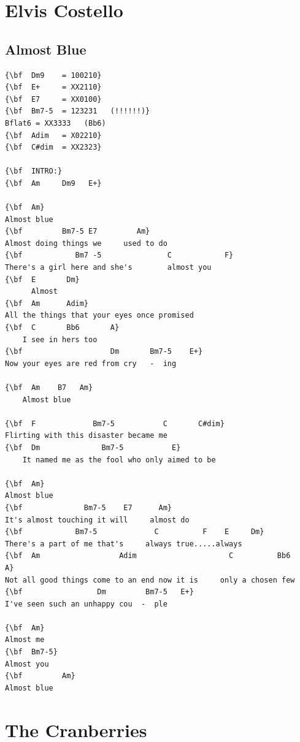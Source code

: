 \documentclass[a4paper]{article}
\begin{document}
\section{Elvis Costello}
\subsection{Almost Blue}
\begin{Verbatim}[commandchars=\\\{\}]
{\bf  Dm9    = 100210}
{\bf  E+     = XX2110}
{\bf  E7     = XX0100}
{\bf  Bm7-5  = 123231   (!!!!!!)}
Bflat6 = XX3333   (Bb6)
{\bf  Adim   = X02210}
{\bf  C#dim  = XX2323}

{\bf  INTRO:}
{\bf  Am     Dm9   E+}

{\bf  Am}
Almost blue
{\bf         Bm7-5 E7         Am}
Almost doing things we     used to do
{\bf            Bm7 -5               C            F}
There's a girl here and she's        almost you
{\bf  E       Dm}
      Almost
{\bf  Am      Adim}
All the things that your eyes once promised
{\bf  C       Bb6       A}
    I see in hers too
{\bf                    Dm       Bm7-5    E+}
Now your eyes are red from cry   -  ing

{\bf  Am    B7   Am}
    Almost blue

{\bf  F             Bm7-5           C       C#dim}
Flirting with this disaster became me
{\bf  Dm              Bm7-5           E}
    It named me as the fool who only aimed to be

{\bf  Am}
Almost blue
{\bf              Bm7-5    E7      Am}
It's almost touching it will     almost do
{\bf            Bm7-5             C          F    E     Dm}
There's a part of me that's     always true.....always
{\bf  Am                  Adim                     C          Bb6    A}
Not all good things come to an end now it is     only a chosen few
{\bf                 Dm         Bm7-5   E+}
I've seen such an unhappy cou  -  ple

{\bf  Am}
Almost me
{\bf  Bm7-5}
Almost you
{\bf         Am}
Almost blue

\end{Verbatim}
\newpage
\section{The Cranberries}
\end{document}
